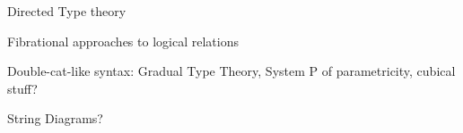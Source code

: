 \documentclass[a4paper,UKenglish,cleveref, autoref, thm-restate]{lipics-v2021}
\begin{document}
Directed Type theory

Fibrational approaches to logical relations

Double-cat-like syntax: Gradual Type Theory, System P of parametricity, cubical stuff?

String Diagrams? 



\end{document}
